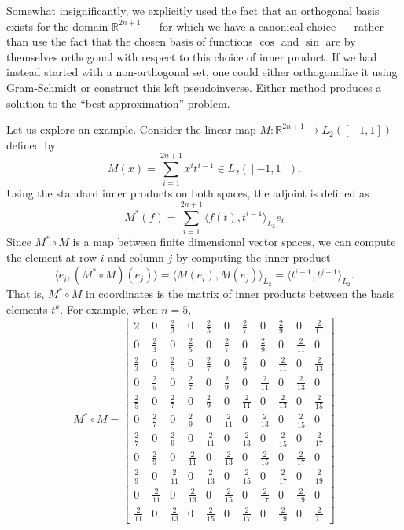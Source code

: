 Somewhat insignificantly, we explicitly used the fact that an orthogonal basis exists for the domain \(\mathbb{R}^{2n+1}\) --- for which we have a canonical choice --- rather than use the fact that the chosen basis of functions \(\cos\) and \(\sin\) are by themselves orthogonal with respect to this choice of inner product.
If we had instead started with a non-orthogonal set, one could either orthogonalize it using Gram-Schmidt or construct this left pseudoinverse.
Either method produces a solution to the ``best approximation'' problem.

Let us explore an example.
Consider the linear map \(M: \mathbb{R}^{2n +1} \to L_2([-1, 1])\) defined by
\[
  M(x) = \sum_{i = 1}^{2n+1} x^{i} t^{i-1} \in L_2([-1, 1]).
\]
Using the standard inner products on both spaces, the adjoint is defined as
\[
  M^*(f)
    = \sum_{i = 1}^{2n + 1} \langle f(t), t^{i-1} \rangle_{L_2} e_i
\]
Since \(M^* \circ M\) is a map between finite dimensional vector spaces, we can compute the element at row \(i\) and column \(j\) by computing the inner product
\[
  \langle e_i, (M^*\circ M)(e_j) \rangle = \langle M(e_i), M(e_j) \rangle_{L_2} = \langle t^{i - 1}, t^{j - 1} \rangle_{L_2}.
\]
That is, \(M^*\circ M\) in coordinates is the matrix of inner products between the basis elements \(t^k.\)
For example, when \(n = 5,\)
\[
M^* \circ M
  =
    \begin{bmatrix}
      2 & 0 & \frac{2}{3} & 0 & \frac{2}{5} & 0 & \frac{2}{7} & 0 & \frac{2}{9} & 0 & \frac{2}{11}\\ 0 & \frac{2}{3} & 0 & \frac{2}{5} & 0 & \frac{2}{7} & 0 & \frac{2}{9} & 0 & \frac{2}{11} & 0\\ \frac{2}{3} & 0 & \frac{2}{5} & 0 & \frac{2}{7} & 0 & \frac{2}{9} & 0 & \frac{2}{11} & 0 & \frac{2}{13}\\ 0 & \frac{2}{5} & 0 & \frac{2}{7} & 0 & \frac{2}{9} & 0 & \frac{2}{11} & 0 & \frac{2}{13} & 0\\ \frac{2}{5} & 0 & \frac{2}{7} & 0 & \frac{2}{9} & 0 & \frac{2}{11} & 0 & \frac{2}{13} & 0 & \frac{2}{15}\\ 0 & \frac{2}{7} & 0 & \frac{2}{9} & 0 & \frac{2}{11} & 0 & \frac{2}{13} & 0 & \frac{2}{15} & 0\\ \frac{2}{7} & 0 & \frac{2}{9} & 0 & \frac{2}{11} & 0 & \frac{2}{13} & 0 & \frac{2}{15} & 0 & \frac{2}{17}\\ 0 & \frac{2}{9} & 0 & \frac{2}{11} & 0 & \frac{2}{13} & 0 & \frac{2}{15} & 0 & \frac{2}{17} & 0\\ \frac{2}{9} & 0 & \frac{2}{11} & 0 & \frac{2}{13} & 0 & \frac{2}{15} & 0 & \frac{2}{17} & 0 & \frac{2}{19}\\ 0 & \frac{2}{11} & 0 & \frac{2}{13} & 0 & \frac{2}{15} & 0 & \frac{2}{17} & 0 & \frac{2}{19} & 0\\ \frac{2}{11} & 0 & \frac{2}{13} & 0 & \frac{2}{15} & 0 & \frac{2}{17} & 0 & \frac{2}{19} & 0 & \frac{2}{21}
    \end{bmatrix}
\]
